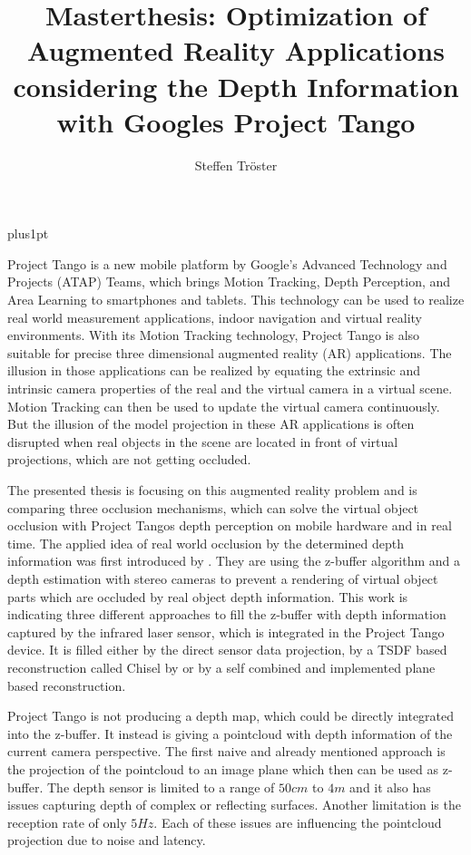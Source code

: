 \documentclass[12pt]{support/thcolognereport}
\title{Masterthesis: Optimization of Augmented Reality Applications considering the Depth Information with Googles Project Tango}
\author{Steffen Tröster}
\begin{document}
\baselineskip=18pt plus1pt

\maketitle 

\setlength{\parskip}{1em}

Project Tango is a new mobile platform by Google’s Advanced Technology and Projects (ATAP) Teams, which brings Motion Tracking, Depth Perception, and Area Learning to smartphones and tablets. This technology can be used to realize real world measurement applications, indoor navigation and virtual reality environments.  With its Motion Tracking technology, Project Tango is also suitable for precise three dimensional augmented reality (AR) applications. The illusion in those applications can be realized by equating the extrinsic and intrinsic camera properties of the real and the virtual camera in a virtual scene. Motion Tracking can then be used to update the virtual camera continuously. But the illusion of the model projection in these AR applications is often disrupted when real objects in the scene are located in front of virtual projections, which are not getting occluded.

The presented thesis is focusing on this augmented reality problem and is comparing three occlusion mechanisms, which can solve the virtual object occlusion with Project Tangos depth perception on mobile hardware and in real time. The applied idea of real world occlusion by the determined depth information was first introduced by \citet{wloka1995resolving}. They are using the z-buffer algorithm and a depth estimation with stereo cameras to prevent a rendering of virtual object parts which are occluded by real object depth information. This work is indicating three different approaches to fill the z-buffer with depth information captured by the infrared laser sensor, which is integrated in the Project Tango device. It is filled either by the direct sensor data projection, by a TSDF based reconstruction called Chisel by \citet{Klingensmith_2015_7924} or by a self combined and implemented plane based reconstruction. 

Project Tango is not producing a depth map, which could be directly integrated into the z-buffer. It instead is giving a pointcloud with depth information of the current camera perspective. The first naive and already mentioned approach is the projection of the pointcloud to an image plane which then can be used as z-buffer. The depth sensor is limited to a range of \(50cm\) to \(4m\) and it also has issues capturing depth of complex or reflecting surfaces. Another limitation is the reception rate of only \(5Hz\). Each of these issues are influencing the pointcloud projection due to noise and latency.
\end{document}
